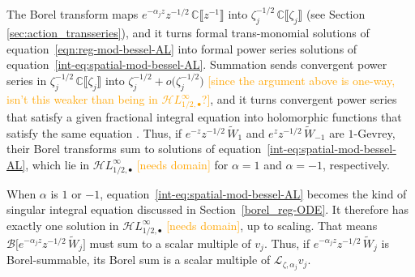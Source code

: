 \documentclass{article}
\newcommand{\singexp}[2]{\mathcal{H}L^\infty_{#1, #2}}
\newcommand{\singexpalg}[1]{\singexp{#1}{\bullet}}
\newcommand{\C}{\mathbb{C}}
\newcommand{\laplace}{\mathcal{L}}
\newcommand{\borel}{\mathcal{B}}
\theoremstyle{definition}
\theoremstyle{plain}
\begin{document}
{The Borel transform maps $e^{-\alpha_j z} z^{-1/2}\,\C\llbracket z^{-1} \rrbracket$ into $\zeta_j^{-1/2}\,\C\llbracket \zeta_j \rrbracket$ (see Section \ref{sec:action_transseries}), and it turns formal trans-monomial solutions of equation~\eqref{eqn:reg-mod-bessel-AL} into formal power series solutions of equation~\eqref{int-eq:spatial-mod-bessel-AL}. Summation sends convergent power series in $\zeta_j^{-1/2}\,\C\llbracket \zeta_j \rrbracket$ into $\zeta_j^{-1/2}+ o\big(\zeta_j^{-1/2}\big)$ \textcolor{orange}{[since the argument above is one-way, isn't this weaker than being in $\singexpalg{1/2}$?]}, and it turns convergent power series that satisfy a given fractional integral equation into holomorphic functions that satisfy the same equation \cite[Lemma 2]{reg-sing-volterra}. Thus, if $e^{-z} z^{-1/2}\,\tilde{W}_1$ and $e^z z^{-1/2}\,\tilde{W}_{-1}$ are $1$-Gevrey, their Borel transforms sum to solutions of equation~\eqref{int-eq:spatial-mod-bessel-AL}, which lie in $\singexpalg{1/2}$ \textcolor{orange}{[needs domain]} for $\alpha = 1$ and $\alpha = -1$, respectively.

When $\alpha$ is $1$ or $-1$, equation~\eqref{int-eq:spatial-mod-bessel-AL} becomes the kind of singular integral equation discussed in Section~\ref{borel_reg-ODE}. It therefore has exactly one solution in $\singexpalg{1/2}$ \textcolor{orange}{[needs domain]}, up to scaling. That means $\borel\big[ e^{-\alpha_j z} z^{-1/2}\,\tilde{W}_j \big]$ must sum to a scalar multiple of $v_j$. Thus, if $e^{-\alpha_j z} z^{-1/2}\,\tilde{W}_j$ is Borel-summable, its Borel sum is a scalar multiple of $\laplace_{\zeta, \alpha_j} v_j$.

}
\end{document}
